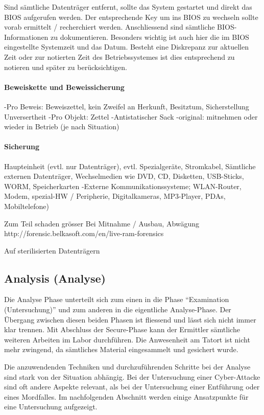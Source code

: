 Sind sämtliche Datenträger entfernt, sollte das System gestartet und direkt das BIOS aufgerufen werden. Der entsprechende Key um ins BIOS zu wechseln sollte vorab ermittelt / recherchiert werden. Anschliessend sind sämtliche BIOS-Informationen zu dokumentieren. Besonders wichtig ist auch hier die im BIOS eingestellte Systemzeit und das Datum. Besteht eine Diskrepanz zur aktuellen Zeit oder zur notierten Zeit des Betriebssystemes ist dies entsprechend zu notieren und später zu berücksichtigen.

\paragraph{Beweiskette und Beweissicherung}
-Pro Beweis: Beweiszettel, kein Zweifel an Herkunft, Besitztum, Sicherstellung Unversertheit
-Pro Objekt: Zettel
-Antistatischer Sack
-original: mitnehmen oder wieder in Betrieb (je nach Situation)

\paragraph{Sicherung}
Haupteinheit (evtl. nur Datenträger), evtl. Spezialgeräte, Stromkabel, Sämtliche externen Datenträger, Wechselmedien wie DVD, CD, Disketten, USB-Sticks, WORM, Speicherkarten 
-Externe Kommunikationssysteme; WLAN-Router, Modem, spezial-HW / Peripherie, Digitalkameras, MP3-Player, PDAs, Mobiltelefone)

Zum Teil schaden grösser Bei Mitnahme / Ausbau, Abwägung
http://forensic.belkasoft.com/en/live-ram-forensics

Auf sterilisierten Datenträgern


\subsection{Analysis (Analyse)}
Die Analyse Phase unterteilt sich zum einen in die Phase "`Examination (Untersuchung)"' und zum anderen in die eigentliche Analyse-Phase. Der Übergang zwischen diesen beiden Phasen ist fliessend und lässt sich nicht immer klar trennen. Mit Abschluss der Secure-Phase kann der Ermittler sämtliche weiteren Arbeiten im Labor durchführen. Die Anwesenheit am Tatort ist nicht mehr zwingend, da sämtliches Material eingesammelt und gesichert wurde.

Die anzuwendenden Techniken und durchzuführenden Schritte bei der Analyse sind stark von der Situation abhängig. Bei der Untersuchung einer Cyber-Attacke sind oft andere Aspekte relevant, als bei der Untersuchung einer Entführung oder eines Mordfalles. Im nachfolgenden Abschnitt werden einige Ansatzpunkte für eine Untersuchung aufgezeigt.

